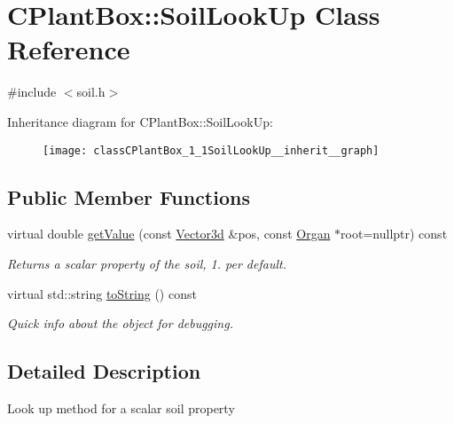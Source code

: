 \hypertarget{classCPlantBox_1_1SoilLookUp}{}\section{C\+Plant\+Box\+:\+:Soil\+Look\+Up Class Reference}
\label{classCPlantBox_1_1SoilLookUp}


{\ttfamily \#include $<$soil.\+h$>$}



Inheritance diagram for C\+Plant\+Box\+:\+:Soil\+Look\+Up\+:\nopagebreak
\begin{figure}[H]
\begin{center}
\leavevmode
\texttt{[image: classCPlantBox\_1\_1SoilLookUp\_\_inherit\_\_graph]}
\end{center}
\end{figure}
\subsection*{Public Member Functions}
\begin{DoxyCompactItemize}
\item 
virtual double \hyperlink{classCPlantBox_1_1SoilLookUp_a46ace0d168532b6eb9bec8e6a1d64814}{get\+Value} (const \hyperlink{classCPlantBox_1_1Vector3d}{Vector3d} \&pos, const \hyperlink{classCPlantBox_1_1Organ}{Organ} $\ast$root=nullptr) const
\begin{DoxyCompactList}\small\item\em Returns a scalar property of the soil, 1. per default. \end{DoxyCompactList}\item 
\mbox{\label{classCPlantBox_1_1SoilLookUp_ab6a76c2eb305b2a059202c8a4e59515b}} 
virtual std\+::string \hyperlink{classCPlantBox_1_1SoilLookUp_ab6a76c2eb305b2a059202c8a4e59515b}{to\+String} () const
\begin{DoxyCompactList}\small\item\em Quick info about the object for debugging. \end{DoxyCompactList}\end{DoxyCompactItemize}


\subsection{Detailed Description}
Look up method for a scalar soil property 

